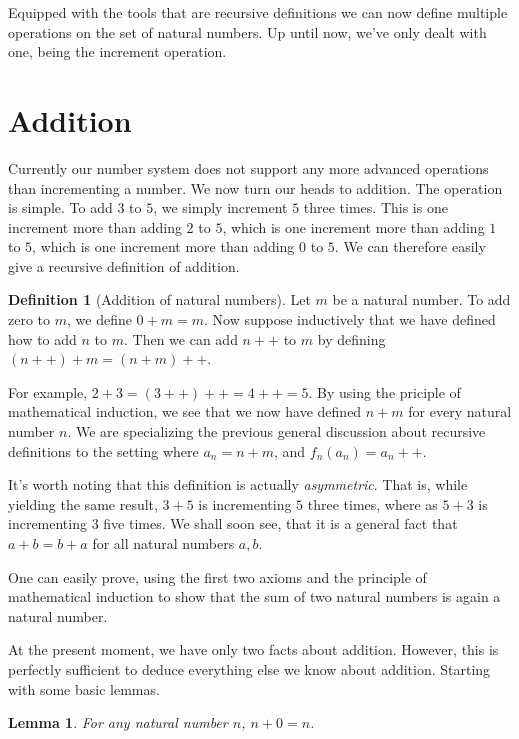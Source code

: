 \documentclass[a4paper, twocolumn]{report}
\newcounter{dummy} \numberwithin{dummy}{section}
\newtheorem{lma}[dummy]{Lemma}
\theoremstyle{definition}
\newtheorem{defn}[dummy]{Definition}
\theoremstyle{solution}
\newcommand{\dplus}{{+}{+}} %
\begin{document}
Equipped with the tools that are recursive definitions we can now define
multiple operations on the set of natural numbers. Up until now, we've only
dealt with one, being the increment operation.

\section{Addition}

Currently our number system does not support any more advanced operations than
incrementing a number.  We now turn our heads to addition. The operation is
simple. To add $3$ to $5$, we simply increment $5$ three times. This is one
increment more than adding $2$ to $5$, which is one increment more than adding
$1$ to $5$, which is one increment more than adding $0$ to $5$. We can
therefore easily give a recursive definition of addition.

\begin{defn}[Addition of natural numbers]
  \label{defn_221}
  Let $m$ be a natural number. To add zero to $m$, we define $0 + m = m$. Now
  suppose inductively that we have defined how to add $n$ to $m$. Then we can
  add $n\dplus$ to $m$ by defining $(n\dplus) + m = (n + m)\dplus$.        
\end{defn}
  
For example, $2 + 3 = (3\dplus)\dplus = 4\dplus = 5$. By using the priciple of mathematical
induction, we see that we now have defined $n + m$ for every natural number
$n$. We are specializing the previous general discussion about recursive
definitions to the setting where $a_{n} = n + m$, and $f_{n}\left( a_n \right)
= a_{n}\dplus$.

It's worth noting that this definition is actually \textit{asymmetric}. That
is, while yielding the same result, $3 + 5$ is incrementing $5$ three times,
where as $5 + 3$ is incrementing $3$ five times. We shall soon see, that it is
a general fact that $a + b = b + a$ for all natural numbers $a, b$. 

One can easily prove, using the first two axioms and the principle of
mathematical induction to show that the sum of two natural numbers is again a
natural number.

At the present moment, we have only two facts about addition. However, this is
perfectly sufficient to deduce everything else we know about addition. Starting
with some basic lemmas.

\begin{lma}
  \label{lma_222}
  For any natural number $n$, $n + 0 = n$. 
\end{lma}
\end{document}
